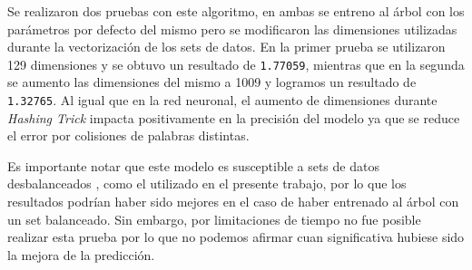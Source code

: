 \documentclass[10pt,a4paper]{article}
\begin{document}
Se realizaron dos pruebas con este algoritmo, en ambas se entreno al árbol con los parámetros por defecto del mismo pero se modificaron las dimensiones utilizadas durante la vectorización de los sets de datos. En la primer prueba se utilizaron 129 dimensiones y se obtuvo un resultado de \texttt{1.77059}, mientras que en la segunda se aumento las dimensiones del mismo a 1009 y logramos un resultado de \texttt{1.32765}. Al igual que en la red neuronal, el aumento de dimensiones durante \textit{Hashing Trick} impacta positivamente en la precisión del modelo ya que se reduce el error por colisiones de palabras distintas.

Es importante notar que este modelo es susceptible a sets de datos desbalanceados \cite{sklearn_dtree}, como el utilizado en el presente trabajo, por lo que los resultados podrían haber sido mejores en el caso de haber entrenado al árbol con un set balanceado. Sin embargo, por limitaciones de tiempo no fue posible realizar esta prueba por lo que no podemos afirmar cuan significativa hubiese sido la mejora de la predicción.
\end{document}
